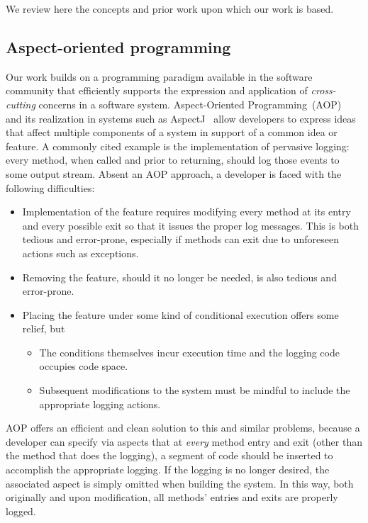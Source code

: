 \documentclass[sigplan,anonymous,review]{acmart}
\begin{document}
We review here the concepts and prior work upon which our work is based.
\subsection{Aspect-oriented programming}

Our work builds on a programming paradigm available in the software community that efficiently supports the expression and application of \emph{cross-cutting} concerns in a software system.  Aspect-Oriented Programming~(AOP)~\cite{gregor:97} and its realization in systems such as AspectJ~\cite{aspectj} allow developers to express ideas that affect multiple components of a system in support of a common idea or feature. A commonly cited example is the implementation of pervasive logging: every method, when called and prior to returning, should log those events to some output stream. Absent an AOP approach, a developer is faced with the following difficulties:
\begin{itemize}
    \item Implementation of the feature requires modifying every method at its entry and every possible exit so that it issues the proper log messages.  This is both tedious and error-prone, especially if methods can exit due to unforeseen actions such as exceptions.
    \item Removing the feature, should it no longer be needed, is also tedious and error-prone.
    \item Placing the feature under some kind of conditional execution offers some relief, but
    \begin{itemize}
        \item The conditions themselves incur execution time and the logging code occupies code space.
        \item Subsequent modifications to the system must be mindful to include the appropriate logging actions.
    \end{itemize}
\end{itemize}
AOP offers an efficient and clean solution to this and similar problems, because a developer can specify via aspects that at \emph{every} method entry and exit (other than the method that does the logging), a segment of code should be inserted to accomplish the appropriate logging.  If the logging is no longer desired, the associated aspect is simply omitted when building the system.  In this way, both originally and upon modification, all methods' entries and exits are properly logged.
\end{document}
